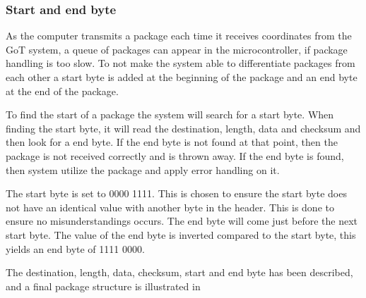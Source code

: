 \subsubsection{Start and end byte}
As the computer transmits a package each time it receives coordinates from the GoT system, a queue of packages can appear in the microcontroller, if package handling is too slow. To not make the system able to differentiate packages from each other a start byte is added at the beginning of the package and an end byte at the end of the package. 

To find the start of a package the system will search for a start byte. When finding the start byte, it will read the destination, length, data and checksum and then look for a end byte. If the end byte is not found at that point, then the package is not received correctly and is thrown away. If the end byte is found, then system utilize the package and apply error handling on it. 

The start byte is set to 0000 1111. This is chosen to ensure the start byte does not have an identical value with another byte in the header. This is done to ensure no misunderstandings occurs. The end byte will come just before the next start byte. The value of the end byte is inverted compared to the start byte, this yields an end byte of 1111 0000.

The destination, length, data, checksum, start and end byte has been described, and a final package structure is illustrated in 

